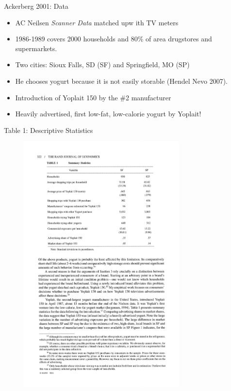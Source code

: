\documentclass[xcolor=pdftex,dvipsnames,table,mathserif]{beamer}
\begin{document}
\begin{frame}{Ackerberg 2001: Data}
\begin{itemize}
\item AC Neilsen \textit{Scanner Data} matched upw ith TV meters
\item 1986-1989 covers 2000 households and 80\% of area drugstores and supermarkets.
\item Two cities: Sioux Falls, SD \alert{(SF)} and Springfield, MO \alert{(SP)}
\item He chooses yogurt because it is not easily storable (Hendel Nevo 2007).
\item Introduction of \alert{Yoplait 150} by the \#2 manufacturer
\item Heavily advertised, first low-fat, low-calorie yogurt by Yoplait!
\end{itemize}
\end{frame}

\begin{frame}{Table 1: Descriptive Statistics}
\begin{figure}[htbp]
\begin{center}
\includegraphics[width=8.5cm]{resources/acker1.pdf}
\label{default}
\end{center}
\end{figure}
\end{frame}
\end{document}
